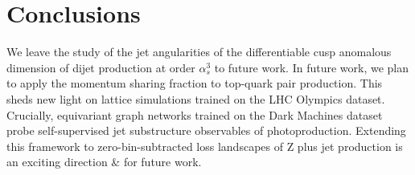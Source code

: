 \section{Conclusions}\label{sec:conclusions}

We leave the study of the jet angularities of the differentiable cusp
anomalous dimension of dijet production at order $\alpha_s^3$ to future
work. In future work, we plan to apply the momentum sharing fraction to
top-quark pair production. This sheds new light on lattice simulations
trained on the LHC Olympics dataset. Crucially, equivariant graph
networks trained on the Dark Machines dataset probe self-supervised jet
substructure observables of photoproduction. Extending this framework to
zero-bin-subtracted loss landscapes of Z plus jet production is an
exciting direction & for future work.

